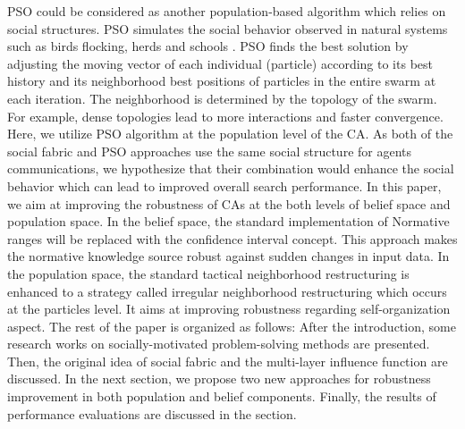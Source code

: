 \documentclass[letterpaper]{article}
\begin{document}
PSO could be considered as another population-based algorithm which relies on social structures. PSO simulates the social behavior observed in natural systems such as birds flocking, herds and schools \cite{kennedy2011particle}. PSO finds the best solution by adjusting the moving vector of each individual (particle) according to its best history and its neighborhood best positions of particles in the entire swarm at each iteration. The neighborhood is determined by the topology of the swarm. For example, dense topologies lead to more interactions and faster convergence. Here, we utilize PSO algorithm at the population level of the CA. As both of the social fabric and PSO approaches use the same social structure for agents communications, we hypothesize that their combination would enhance the social behavior which can lead to improved overall search performance. \newline
In this paper, we aim at improving the robustness of CAs at the both levels of belief space and population space. In the belief space, the standard implementation of Normative ranges will be replaced with the confidence interval concept. This approach makes the normative knowledge source robust against sudden changes in input data. In the population space, the standard tactical neighborhood restructuring is enhanced to a strategy called irregular neighborhood restructuring which occurs at the particles level. It aims at improving robustness regarding self-organization aspect.\newline
The rest of the paper is organized as follows: After the introduction, some research works on socially-motivated problem-solving methods are presented. Then, the original idea of social fabric and the multi-layer influence function are discussed. In the next section, we propose two new approaches for robustness improvement in both population and belief components. Finally, the results of performance evaluations are discussed in the section.
\end{document}

